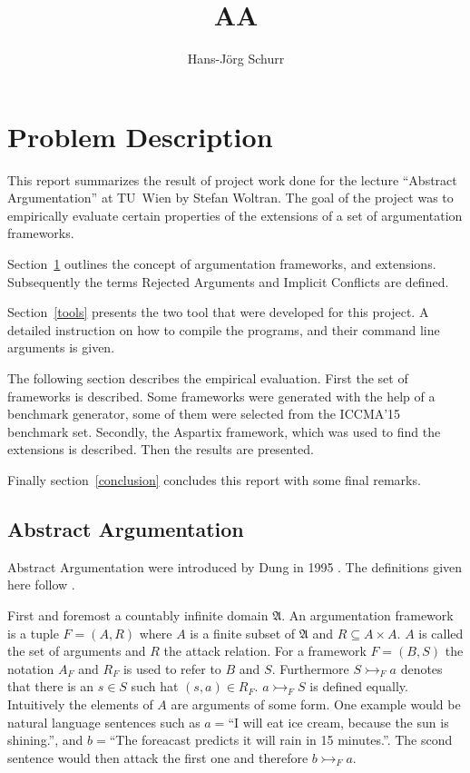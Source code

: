 \documentclass{scrartcl}
\title{AA}
\author{Hans-Jörg Schurr}
\begin{document}
\maketitle
\tableofcontents

\section{Problem Description}
\label{problemdesc}
This report summarizes the result of project work done for the lecture
``Abstract Argumentation'' at TU~Wien by Stefan Woltran. The goal of the project
was to empirically evaluate certain properties of the extensions of a set of
argumentation frameworks.

Section~\ref{problemdesc} outlines the concept of argumentation frameworks, and
extensions. Subsequently the terms Rejected Arguments and Implicit Conflicts are
defined.

Section~\ref{tools} presents the two tool that were developed for this project.
A detailed instruction on how to compile the programs, and their command line
arguments is given.

The following section describes the empirical evaluation. First the set of
frameworks is described.  Some frameworks were generated with the help of a
benchmark generator, some of them were selected from the ICCMA'15 benchmark set.
Secondly, the Aspartix framework, which was used to find the extensions is
described. Then the results are presented.

Finally section~\ref{conclusion} concludes this report with some final remarks.

\subsection{Abstract Argumentation}

Abstract Argumentation were introduced by Dung in 1995 \cite{dung1995}. The
definitions given here follow \cite{linsbichler2015hidden}.

First and foremost a countably infinite domain $\mathfrak{A}$. An argumentation
framework is a tuple $F = (A,R)$ where $A$ is a finite subset of $\mathfrak{A}$
and $R \subseteq A\times A$.  $A$ is called the set of arguments and $R$ the
attack relation.  For a framework $F = (B, S)$ the notation $A_F$ and $R_F$ is
used to refer to $B$ and $S$. Furthermore $S \rightarrowtail_F a$ denotes that
there is an $s \in S$ such hat $(s, a) \in R_F$. $a \rightarrowtail_F S$ is
defined equally. Intuitively the elements of $A$ are arguments of some form.
One example would be natural language sentences such as $a=$``I will eat ice
cream, because the sun is shining.'', and $b=$``The foreacast predicts it will
rain in 15 minutes.''. The scond sentence would then attack the first one and
therefore $b \rightarrowtail_F a$.
\end{document}
